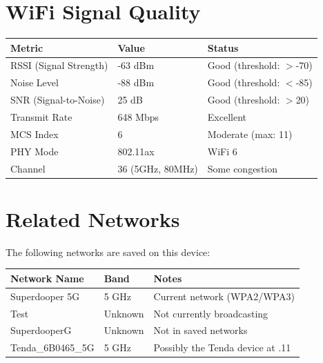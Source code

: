 \documentclass[11pt,letterpaper]{article}
\begin{document}
\section{WiFi Signal Quality}

\begin{center}
\begin{tabular}{lll}
\toprule
\textbf{Metric} & \textbf{Value} & \textbf{Status} \\
\midrule
RSSI (Signal Strength) & -63 dBm & \textcolor{goodcolor}{Good} (threshold: $>$-70) \\
Noise Level & -88 dBm & \textcolor{goodcolor}{Good} (threshold: $<$-85) \\
SNR (Signal-to-Noise) & 25 dB & \textcolor{goodcolor}{Good} (threshold: $>$20) \\
Transmit Rate & 648 Mbps & \textcolor{goodcolor}{Excellent} \\
MCS Index & 6 & Moderate (max: 11) \\
PHY Mode & 802.11ax & WiFi 6 \\
Channel & 36 (5GHz, 80MHz) & Some congestion \\
\bottomrule
\end{tabular}
\end{center}

\section{Related Networks}

The following networks are saved on this device:

\begin{center}
\begin{tabular}{llp{5cm}}
\toprule
\textbf{Network Name} & \textbf{Band} & \textbf{Notes} \\
\midrule
Superdooper 5G & 5 GHz & Current network (WPA2/WPA3) \\
Test & Unknown & Not currently broadcasting \\
SuperdooperG & Unknown & Not in saved networks \\
Tenda\_6B0465\_5G & 5 GHz & Possibly the Tenda device at .11 \\
\bottomrule
\end{tabular}
\end{center}
\end{document}
